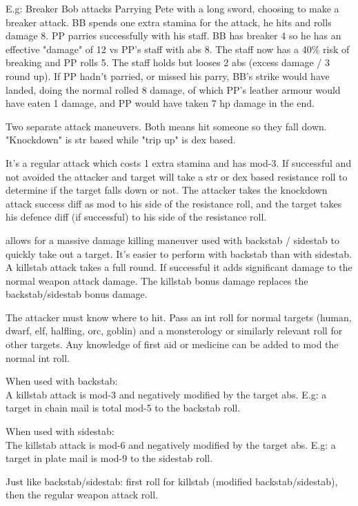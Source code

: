 E.g: Breaker Bob attacks Parrying Pete with a long sword, choosing to make a breaker attack. BB spends one extra stamina for the attack, he hits and rolls damage 8. PP parries successfully with his staff. BB has breaker 4 so he has an effective "damage" of 12 vs PP's staff with abs 8. The staff now has a 40\% risk of breaking and PP rolls 5. The staff holds but looses 2 abs (excess damage / 3 round up). If PP hadn't parried, or missed his parry, BB's strike would have landed, doing the normal rolled 8 damage, of which PP's leather armour would have eaten 1 damage, and PP would have taken 7 hp damage in the end.


 Two separate attack maneuvers. Both means hit someone so they fall down. "Knockdown" is str based while "trip up" is dex based.

It's a regular attack which costs 1 extra stamina and has mod-3. If successful and not avoided the attacker and target will take a str or dex based resistance roll to determine if the target falls down or not. The attacker takes the knockdown attack success diff as mod to his side of the resistance roll, and the target takes his defence diff (if successful) to his side of the resistance roll.


 allows for a massive damage killing maneuver used with backstab / sidestab to quickly take out a target. It's easier to perform with backstab than with sidestab. A killstab attack takes a full round. If successful it adds significant damage to the normal weapon attack damage. The killstab bonus damage replaces the backstab/sidestab bonus damage.

The attacker must know where to hit. Pass an int roll for normal targets (human, dwarf, elf, halfling, orc, goblin) and a monsterology or similarly relevant roll for other targets. Any knowledge of first aid or medicine can be added to mod the normal int roll.

When used with backstab:\\
A killstab attack is mod-3 and negatively modified by the target abs. E.g: a target in chain mail is total mod-5 to the backstab roll.

When used with sidestab:\\
The killstab attack is mod-6 and negatively modified by the target abs. E.g: a target in plate mail is mod-9 to the sidestab roll.

Just like backstab/sidestab: first roll for killstab (modified backstab/sidestab), then the regular weapon attack roll. 

